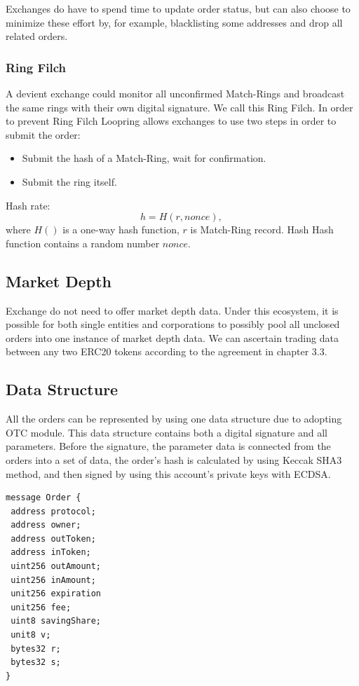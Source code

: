 \documentclass[UTF8,nofonts]{article}
\begin{document}
Exchanges do have to spend time to update order status, but can also choose to minimize these effort by, for example, blacklisting some addresses and drop all related orders.

\subsubsection{Ring Filch}

A devient exchange could monitor all unconfirmed Match-Rings and broadcast the same rings with their own digital signature. We call this Ring Filch. In order to prevent Ring Filch Loopring allows exchanges to use two steps in order to submit the order: 
\begin{itemize}
  \item Submit the hash of a Match-Ring, wait for confirmation.
  \item Submit the ring itself.
\end{itemize}
Hash rate:
$$h = H(r,  nonce)\text{, }$$
where $H()$ is a one-way hash function, $r$ is Match-Ring record. Hash Hash function contains a random number $nonce$.

\subsection{Market Depth\label{sec: marketdepth}}

Exchange do not need to offer market depth data. Under this ecosystem, it is possible for both single entities and corporations to possibly pool all unclosed orders into one instance of market depth data. We can ascertain trading data between any two ERC20 tokens according to the agreement in chapter 3.3.

\subsection{Data Structure\label{sec: dataformat}}

All the orders can be represented by using one data structure due to adopting OTC module. This data structure contains both a digital signature and all parameters. Before the signature, the parameter data is connected from the orders into a set of data, the order's hash is calculated by using Keccak SHA3 method, and then signed by using this account's private keys with ECDSA.


\begin{verbatim}
message Order {
 address protocol;
 address owner;
 address outToken;
 address inToken;
 uint256 outAmount;
 uint256 inAmount;
 unit256 expiration
 unit256 fee;
 uint8 savingShare;
 unit8 v;
 bytes32 r;
 bytes32 s;
}
\end{verbatim}
\end{document}
